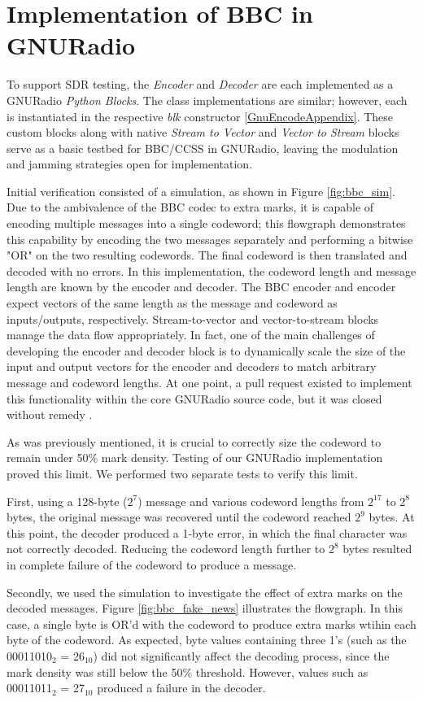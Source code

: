 \documentclass[conference]{IEEEtran}
\begin{document}
\section{Implementation of BBC in GNURadio}
To support SDR testing, the \textit{Encoder} and \textit{Decoder} are each implemented as a GNURadio \textit{Python Blocks}. The class implementations are similar; however, each is instantiated in the respective \textit{blk} constructor \ref{GnuEncodeAppendix}. These custom blocks along with native \textit{Stream to Vector} and \textit{Vector to Stream} blocks serve as a basic testbed for BBC/CCSS in GNURadio, leaving the modulation and jamming strategies open for implementation.  

Initial verification consisted of a simulation, as shown in Figure \ref{fig:bbc_sim}. Due to the ambivalence of the BBC codec to extra marks, it is capable of encoding multiple messages into a single codeword; this flowgraph demonstrates this capability by encoding the two messages separately and performing a bitwise "OR" on the two resulting codewords. The final codeword is then translated and decoded with no errors. In this implementation, the codeword length and message length are known by the encoder and decoder. The BBC encoder and encoder expect vectors of the same length as the message and codeword as inputs/outputs, respectively. Stream-to-vector and vector-to-stream blocks manage the data flow appropriately. In fact, one of the main challenges of developing the encoder and decoder block is to dynamically scale the size of the input and output vectors for the encoder and decoders to match arbitrary message and codeword lengths. At one point, a pull request existed to implement this functionality within the core GNURadio source code, but it was closed without remedy \cite{grcissue}. 

As was previously mentioned, it is crucial to correctly size the codeword to remain under 50\% mark density. Testing of our GNURadio implementation proved this limit. We performed two separate tests to verify this limit. 

First, using a 128-byte ($2^{7}$) message and various codeword lengths from $2^{17}$ to $2^8$ bytes, the original message was recovered until the codeword reached $2^9$ bytes. At this point, the decoder produced a 1-byte error, in which the final character was not correctly decoded. Reducing the codeword length further to $2^8$ bytes resulted in complete failure of the codeword to produce a message. 

Secondly, we used the simulation to investigate the effect of extra marks on the decoded messages. Figure \ref{fig:bbc_fake_news} illustrates the flowgraph. In this case, a single byte is OR'd with the codeword to produce extra marks wtihin each byte of the codeword. As expected, byte values containing three 1's (such as the 00011010$_2$ = 26$_{10}$) did not significantly affect the decoding process, since the mark density was still below the 50\% threshold. However, values such as 00011011$_2$ = 27$_{10}$ produced a failure in the decoder. 
\end{document}
